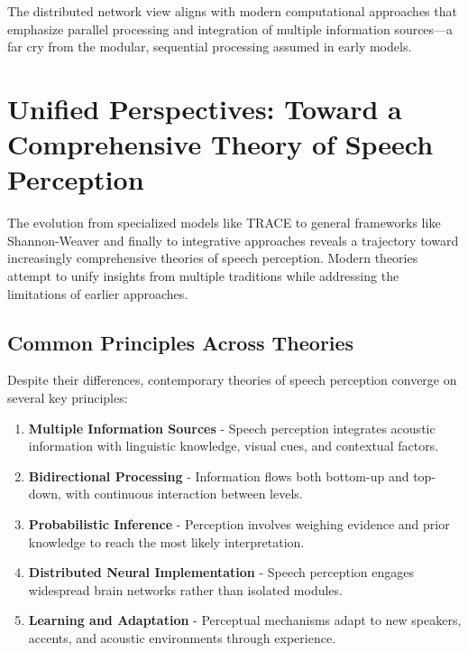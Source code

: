 \documentclass[12pt,a4paper]{article}
\begin{document}
The distributed network view aligns with modern computational approaches that emphasize parallel processing and integration of multiple information sources—a far cry from the modular, sequential processing assumed in early models.

\section{Unified Perspectives: Toward a Comprehensive Theory of Speech Perception}

The evolution from specialized models like TRACE to general frameworks like Shannon-Weaver and finally to integrative approaches reveals a trajectory toward increasingly comprehensive theories of speech perception. Modern theories attempt to unify insights from multiple traditions while addressing the limitations of earlier approaches.

\subsection{Common Principles Across Theories}

Despite their differences, contemporary theories of speech perception converge on several key principles:

\begin{tcolorbox}[enhanced, colback=green!5, colframe=green!75!black, title=Converging Principles in Modern Speech Perception Theories]
\begin{enumerate}
\item \textbf{Multiple Information Sources} - Speech perception integrates acoustic information with linguistic knowledge, visual cues, and contextual factors.

\item \textbf{Bidirectional Processing} - Information flows both bottom-up and top-down, with continuous interaction between levels.

\item \textbf{Probabilistic Inference} - Perception involves weighing evidence and prior knowledge to reach the most likely interpretation.

\item \textbf{Distributed Neural Implementation} - Speech perception engages widespread brain networks rather than isolated modules.

\item \textbf{Learning and Adaptation} - Perceptual mechanisms adapt to new speakers, accents, and acoustic environments through experience.
\end{enumerate}
\end{tcolorbox}
\end{document}
